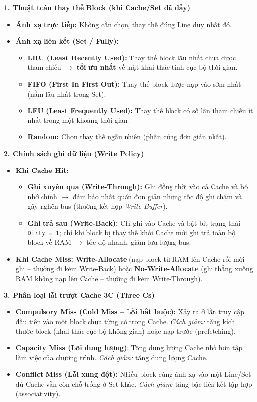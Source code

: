 \textbf{1. Thuật toán thay thế Block (khi Cache/Set đã đầy)}
\begin{itemize}
    \item \textbf{Ánh xạ trực tiếp:} Không cần chọn, thay thế đúng Line duy nhất đó.
    \item \textbf{Ánh xạ liên kết (Set / Fully):}
    \begin{itemize}
        \item \textbf{LRU (Least Recently Used):} Thay thế block lâu nhất chưa được tham chiếu $\rightarrow$ \textbf{tối ưu nhất} về mặt khai thác tính cục bộ thời gian.
        \item \textbf{FIFO (First In First Out):} Thay thế block được nạp vào sớm nhất (nằm lâu nhất trong Set).
        \item \textbf{LFU (Least Frequently Used):} Thay thế block có số lần tham chiếu ít nhất trong một khoảng thời gian.
        \item \textbf{Random:} Chọn thay thế ngẫu nhiên (phần cứng đơn giản nhất).
    \end{itemize}
\end{itemize}

\textbf{2. Chính sách ghi dữ liệu (Write Policy)}
\begin{itemize}
    \item \textbf{Khi Cache Hit:}
    \begin{itemize}
        \item \textbf{Ghi xuyên qua (Write-Through):} Ghi đồng thời vào cả Cache và bộ nhớ chính $\rightarrow$ đảm bảo nhất quán đơn giản nhưng tốc độ ghi chậm và gây nghẽn bus (thường kết hợp \textit{Write Buffer}).
        \item \textbf{Ghi trả sau (Write-Back):} Chỉ ghi vào Cache và bật bit trạng thái \texttt{Dirty = 1}; chỉ khi block bị thay thế khỏi Cache mới ghi trả toàn bộ block về RAM $\rightarrow$ tốc độ nhanh, giảm lưu lượng bus.
    \end{itemize}
    \item \textbf{Khi Cache Miss:} \textbf{Write-Allocate} (nạp block từ RAM lên Cache rồi mới ghi -- thường đi kèm Write-Back) hoặc \textbf{No-Write-Allocate} (ghi thẳng xuống RAM không nạp lên Cache -- thường đi kèm Write-Through).
\end{itemize}

\textbf{3. Phân loại lỗi trượt Cache 3C (Three Cs)}
\begin{itemize}
    \item \textbf{Compulsory Miss (Cold Miss -- Lỗi bắt buộc):} Xảy ra ở lần truy cập đầu tiên vào một block chưa từng có trong Cache. \textit{Cách giảm:} tăng kích thước block (khai thác cục bộ không gian) hoặc nạp trước (prefetching).
    \item \textbf{Capacity Miss (Lỗi dung lượng):} Tổng dung lượng Cache nhỏ hơn tập làm việc của chương trình. \textit{Cách giảm:} tăng dung lượng Cache.
    \item \textbf{Conflict Miss (Lỗi xung đột):} Nhiều block cùng ánh xạ vào một Line/Set dù Cache vẫn còn chỗ trống ở Set khác. \textit{Cách giảm:} tăng bậc liên kết tập hợp (associativity).
\end{itemize}

